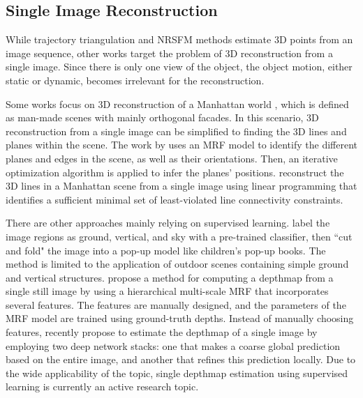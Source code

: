 \subsection{Single Image Reconstruction}
While trajectory triangulation and NRSFM methods estimate 3D points from an image sequence, other works target the problem of 3D reconstruction from a single image. Since there is only one view of the object, the object motion, either static or dynamic, becomes irrelevant for the reconstruction. 

Some works focus on 3D reconstruction of a Manhattan world \cite{Coughlan_ICCV99}, which is defined as
man-made scenes with mainly orthogonal facades. In this scenario, 3D reconstruction from a single image can be simplified to finding the 3D lines and planes within the scene. The work by \citet{Delage_ISRR2005} uses an MRF model to identify the different planes and edges in the scene, as well as their orientations. Then, an iterative optimization algorithm is applied to infer the planes' positions. \citet{Ram_ICCV2013} reconstruct the 3D lines in a Manhattan scene from a single image using linear programming that identifies a sufficient minimal set of least-violated line connectivity constraints.

There are other approaches mainly relying on supervised learning. \citet{Hoiem_CGRAPH2005} label the image regions as ground, vertical, and sky with a pre-trained classifier, then ``cut and fold" the image into a pop-up model like children's pop-up books. The method is limited to the application of outdoor scenes containing simple ground and vertical structures. \citet{Saxena_IJCV2008} propose a method for computing a depthmap from a single still image by using a hierarchical multi-scale MRF that incorporates several features. The features are manually designed, and the parameters of the MRF model are trained using ground-truth depths. Instead of manually choosing features, \citet{eigen2014depth} recently propose to estimate the depthmap of a single image by employing two deep network stacks: one that makes a coarse global prediction based on the entire image, and another that refines this prediction locally. Due to the wide applicability of the topic, single depthmap estimation using supervised learning is currently an active research topic.



















